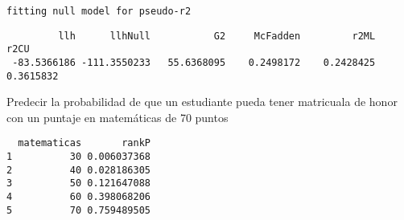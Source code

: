 \documentclass[
]{article}
\newenvironment{Shaded}{\begin{snugshade}}{\end{snugshade}}
\newcommand{\AttributeTok}[1]{\textcolor[rgb]{0.77,0.63,0.00}{#1}}
\newcommand{\DecValTok}[1]{\textcolor[rgb]{0.00,0.00,0.81}{#1}}
\newcommand{\FunctionTok}[1]{\textcolor[rgb]{0.00,0.00,0.00}{#1}}
\newcommand{\NormalTok}[1]{#1}
\newcommand{\OtherTok}[1]{\textcolor[rgb]{0.56,0.35,0.01}{#1}}
\newcommand{\SpecialCharTok}[1]{\textcolor[rgb]{0.00,0.00,0.00}{#1}}
\newcommand{\StringTok}[1]{\textcolor[rgb]{0.31,0.60,0.02}{#1}}
\begin{document}
\begin{verbatim}
fitting null model for pseudo-r2
\end{verbatim}

\begin{verbatim}
         llh      llhNull           G2     McFadden         r2ML         r2CU 
 -83.5366186 -111.3550233   55.6368095    0.2498172    0.2428425    0.3615832 
\end{verbatim}

Predecir la probabilidad de que un estudiante pueda tener matricuala de
honor con un puntaje en matemáticas de 70 puntos

\begin{Shaded}
\end{Shaded}

\begin{verbatim}
  matematicas       rankP
1          30 0.006037368
2          40 0.028186305
3          50 0.121647088
4          60 0.398068206
5          70 0.759489505
\end{verbatim}
\end{document}
